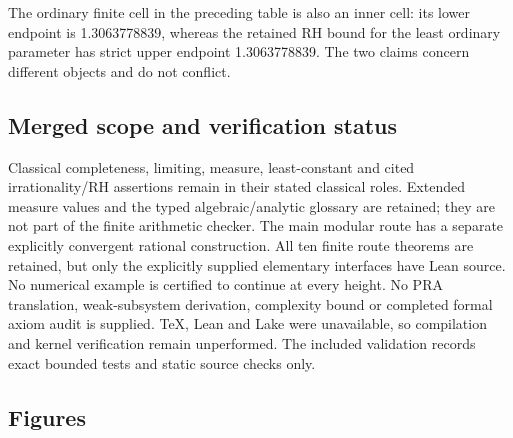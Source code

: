 \documentclass[11pt,reqno]{amsart}
\theoremstyle{blueplain}
\newcounter{type}
\newcounter{asser}
\numberwithin{equation}{section}
\def\hyperlink#1#2{#2}}
\begin{document}
The ordinary finite cell in the preceding table is also an inner cell:
its lower endpoint is 1.3063778839, whereas the retained \hyperlink{def:RH}{RH} bound for
the least ordinary parameter has strict upper endpoint 1.3063778839.
The two claims concern different objects and do not conflict.

\subsection{Merged scope and verification status}\label{sec:merged-status}
Classical completeness, limiting, measure, least-constant and cited
irrationality/\hyperlink{def:RH}{RH} assertions remain in their stated classical roles.
Extended measure values and the typed algebraic/analytic glossary are
retained; they are not part of the finite arithmetic checker. The main
modular route has a separate explicitly convergent rational construction. All ten finite
route theorems are retained, but only the explicitly supplied elementary
interfaces have Lean source. No numerical example is certified to
continue at every height. No \hyperlink{abbr:PRA}{PRA} translation, weak-subsystem derivation,
complexity bound or completed formal axiom audit is supplied. TeX,
Lean and Lake were unavailable, so compilation and kernel verification
remain unperformed. The included validation records exact bounded tests
and static source checks only.

\subsection{Figures}\label{sec:appendix-figures}
\end{document}
